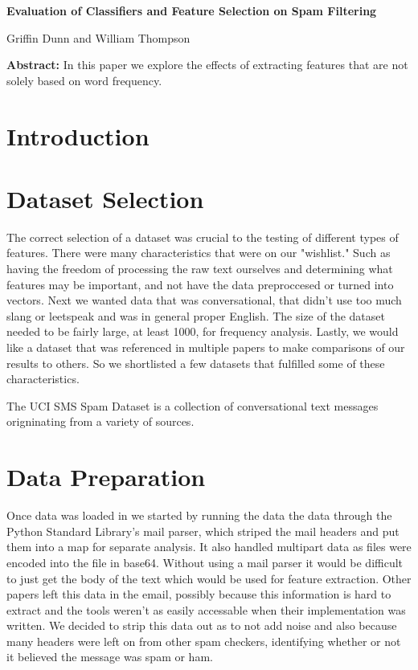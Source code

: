 \documentclass[12pt]{article}
\begin{document}
    \begin{center}
        \textbf{Evaluation of Classifiers and Feature Selection on Spam Filtering} 
    \end{center}

    \begin{center}
        Griffin Dunn and William Thompson
    \end{center}

    \textbf{Abstract:} 
        In this paper we explore the effects of extracting features that are not solely based on word frequency.

    \begin{multicols}{2}
        \section{Introduction}
            

        \section{Dataset Selection}
            The correct selection of a dataset was crucial to the testing of 
            different types of features. There were many characteristics that were
            on our "wishlist." Such as having the freedom of processing 
            the raw text ourselves and determining what features may be important, 
            and not have the data preproccesed or turned into vectors.
            Next we wanted data that was conversational, that didn't use too much 
            slang or leetspeak and was in general proper English. The size of the
            dataset needed to be fairly large, at least 1000, for frequency analysis.
             Lastly, we would like a dataset that was referenced in multiple papers to make comparisons
            of our results to others. So we shortlisted a few datasets that fulfilled
            some of these characteristics.

            The UCI SMS Spam Dataset is a collection of conversational text messages
            origninating from a variety of sources.
        \section{Data Preparation}
            Once data was loaded in we started by running the data the data through
            the Python Standard Library's mail parser, which striped the mail headers
            and put them into a map for separate analysis. It also handled multipart
            data as files were encoded into the file in base64. Without using a mail
            parser it would be difficult to just get the body of the text which
            would be used for feature extraction. Other papers left this data in the
            email, possibly because this information is hard to extract and the tools
            weren't as easily accessable when their implementation was written. We
            decided to strip this data out as to not add noise and also because many 
            headers were left on from other spam checkers, identifying whether or not
            it believed the message was spam or ham.

\end{multicols}
\end{document}
